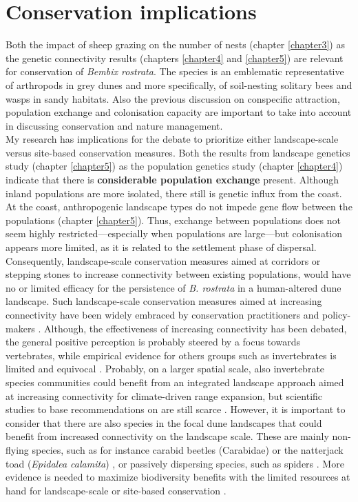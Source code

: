 \documentclass[10pt, twoside]{book} %
\begin{document}
	\section{Conservation implications}
	Both the impact of sheep grazing on the number of nests (chapter \ref{chapter3}) as the genetic connectivity results (chapters \ref{chapter4} and \ref{chapter5}) are relevant for conservation of \textit{Bembix rostrata}. The species is an emblematic representative of arthropods in grey dunes and more specifically, of soil-nesting solitary bees and wasps in sandy habitats. Also the previous discussion on conspecific attraction, population exchange and colonisation capacity are important to take into account in discussing conservation and nature management.\\
	
	My research has implications for the debate to prioritize either landscape-scale versus site-based conservation measures. Both the results from landscape genetics study (chapter \ref{chapter5}) as the population genetics study (chapter \ref{chapter4}) indicate that there is \textbf{considerable population exchange} present. Although inland populations are more isolated, there still is genetic influx from the coast. At the coast, anthropogenic landscape types do not impede gene flow between the populations (chapter \ref{chapter5}). Thus, exchange between populations does not seem highly restricted---especially when populations are large---but colonisation appears more limited, as it is related to the settlement phase of dispersal. Consequently, landscape-scale conservation measures aimed at corridors or stepping stones to increase connectivity between existing populations, would have no or limited efficacy for the persistence of \textit{B. rostrata} in a human-altered dune landscape. Such landscape-scale conservation measures aimed at increasing connectivity have been widely embraced by conservation practitioners and policy-makers \citep{crooks2006}. Although, the effectiveness of increasing connectivity has been debated, the general positive perception is probably steered by a focus towards vertebrates, while empirical evidence for others groups such as invertebrates is limited and equivocal \citep{ovaskainen2008, humphrey2015, watts2016}. Probably, on a larger spatial scale, also invertebrate species communities could benefit from an integrated landscape approach aimed at increasing connectivity for climate-driven range expansion, but scientific studies to base recommendations on are still scarce \citep{maes2022, hodgson2022}. However, it is important to consider that there are also species in the focal dune landscapes that could benefit from increased connectivity on the landscape scale. These are mainly non-flying species, such as for instance carabid beetles (Carabidae) or the natterjack toad (\textit{Epidalea calamita}) \citep{cox2017}, or passively dispersing species, such as spiders \citep{bonte2003}. More evidence is needed to maximize biodiversity benefits with the limited resources at hand for landscape-scale or site-based conservation \citep{watts2016}.\\
	
\end{document}
